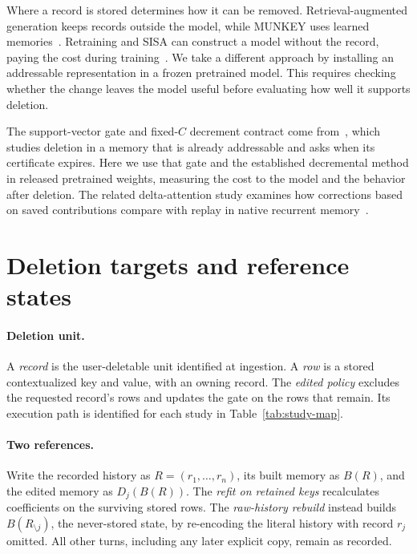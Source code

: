 Where a record is stored determines how it can be removed.
Retrieval-augmented generation keeps records outside the model, while MUNKEY
uses learned memories~\citep{rag,munkey}. Retraining and SISA can construct a
model without the record, paying the cost during training~\citep{caoyang,sisa}.
We take a different approach by installing an addressable representation in
a frozen pretrained model. This requires checking whether the change leaves
the model useful before evaluating how well it supports deletion.

The support-vector gate and fixed-$C$ decrement contract come
from~\citet{svattn}, which studies deletion in a memory that is already
addressable and asks when its certificate expires. Here we use that gate
and the established decremental method in released pretrained weights,
measuring the cost to the model and the behavior after deletion. The related
delta-attention study examines how corrections based on saved contributions
compare with replay in native recurrent memory~\citep{kdaomission}.

\section{Deletion targets and reference states}\label{sec:method}

\paragraph{Deletion unit.}
A \emph{record} is the user-deletable unit identified at ingestion. A
\emph{row} is a stored contextualized key and value, with an owning record.
The \emph{edited policy} excludes the requested record's rows and updates the
gate on the rows that remain. Its execution path is identified for each study
in Table~\ref{tab:study-map}.

\paragraph{Two references.}
Write the recorded history as \(R=(r_1,\ldots,r_n)\), its built memory as
\(B(R)\), and the edited memory as \(D_j(B(R))\). The \emph{refit on
retained keys} recalculates coefficients on the surviving stored rows. The
\emph{raw-history rebuild} instead builds \(B(R_{\setminus j})\), the
never-stored state, by re-encoding the literal history with record \(r_j\)
omitted. All other turns, including any later explicit copy, remain as recorded.

